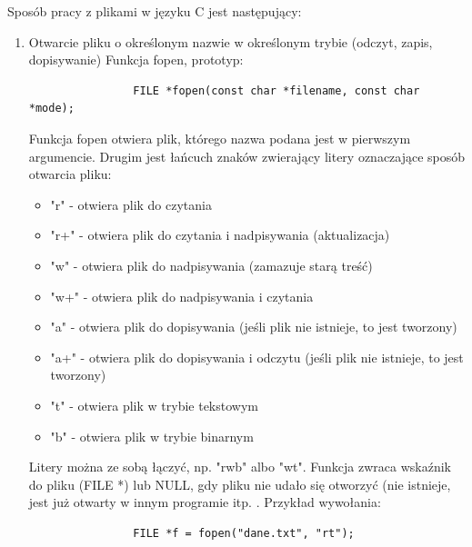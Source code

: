 \documentclass[12pt]{article}
\begin{document}
    Sposób pracy z plikami w języku C jest następujący:
    \begin{enumerate}
        \item Otwarcie pliku o określonym nazwie w określonym trybie (odczyt, zapis, dopisywanie)
            Funkcja fopen, prototyp:
            \begin{verbatim}
                FILE *fopen(const char *filename, const char *mode);
            \end{verbatim}
            Funkcja fopen otwiera plik, którego nazwa podana jest w pierwszym argumencie. Drugim jest
            łańcuch znaków zwierający litery oznaczające sposób otwarcia pliku:
            \begin{itemize}
                \item "r" - otwiera plik do czytania
                \item "r+" - otwiera plik do czytania i nadpisywania (aktualizacja)
                \item "w" - otwiera plik do nadpisywania (zamazuje starą treść)
                \item "w+" - otwiera plik do nadpisywania i czytania
                \item "a" - otwiera plik do dopisywania (jeśli plik nie istnieje, to jest tworzony)
                \item "a+" - otwiera plik do dopisywania i odczytu (jeśli plik nie istnieje, to jest tworzony)
                \item "t" - otwiera plik w trybie tekstowym
                \item "b" - otwiera plik w trybie binarnym
            \end{itemize}
            
            Litery można ze sobą łączyć, np. "rwb" albo "wt".
            Funkcja zwraca wskaźnik do pliku (FILE *) lub NULL, gdy pliku nie udało się otworzyć (nie
            istnieje, jest już otwarty w innym programie itp. .
            Przykład wywołania:
            \begin{verbatim}
                FILE *f = fopen("dane.txt", "rt");
            \end{verbatim}
            
            
            

\end{enumerate}
\end{document}

